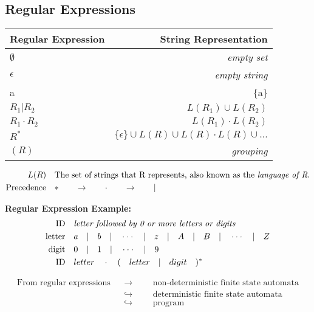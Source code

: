 \documentclass{article}
\newcommand{\ellipse}{\cdot\cdot\cdot}
\newcommand{\sor}{\quad | \quad}
\newcommand{\sdot}{\quad\cdot\quad}
\begin{document}
\subsection{Regular Expressions}

\begin{tabular}{ l | r }
	\textbf{Regular Expression} & \textbf{String Representation} \\
	\hline
	\hline	
	$\emptyset$ & \textit{empty set} \\
	$\epsilon$ & \textit{empty string} \\
	a & \{a\} \\
	$R_1 | R_2$ & $L(R_1) \cup L(R_2)$ \\
	$R_1 \cdot R_2$ & $L(R_1) \cdot L(R_2)$ \\
	$R^*$ & $\{\epsilon\} \cup L(R) \cup L(R) \cdot L(R) \cup ...$ \\
	$(R)$ & \textit{grouping} \\
\end{tabular}

\vspace{1em}
\begin{align*}
L(R) 				&&& \text{The set of strings that R represents, also known as the \textit{language of R}.} \\
\text{Precedence} 	&&& *\qquad\rightarrow\qquad\cdot\qquad\rightarrow\qquad|
\end{align*}

\vspace{1em}
\textbf{Regular Expression Example:}
\begin{align*}
\text{ID} 		&&& \text{\textit{letter followed by 0 or more letters or digits}} \\
\text{letter} 	&&& a\sor b\sor \ellipse \sor z\sor A\sor B\sor \ellipse\sor Z \\
\text{digit} 	&&& 0\sor 1\sor \ellipse \sor 9 \\
\text{ID} 		&&& letter \sdot (\quad letter\sor digit\quad)^* \\
\end{align*}

\begin{align*}
\text{From regular expressions}	&&\longrightarrow &&& \text{non-deterministic finite state automata} \\
						 		&&\hookrightarrow &&& \text{deterministic finite state automata} \\
						 		&&\hookrightarrow &&& \text{program} \\
\end{align*}
\end{document}
